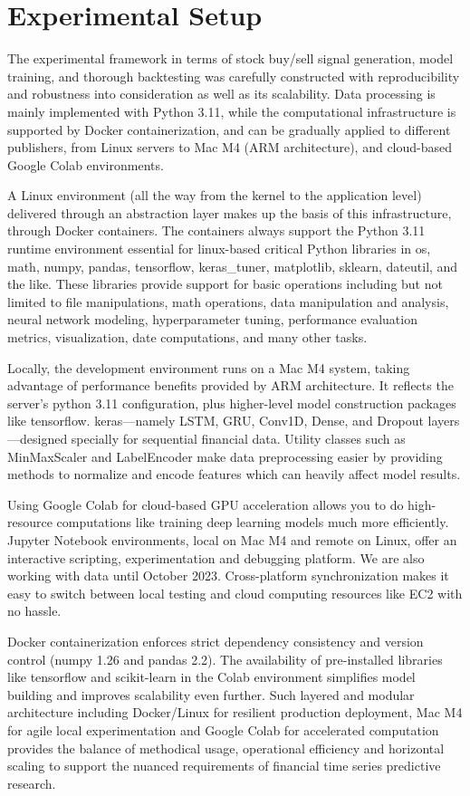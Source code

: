 \chapter{Experimental Setup}
The experimental framework in terms of stock buy/sell signal generation, model training, and thorough backtesting was carefully constructed with reproducibility and robustness into consideration as well as its scalability. Data processing is mainly implemented with Python 3.11, while the computational infrastructure is supported by Docker containerization, and can be gradually applied to different publishers, from Linux servers to Mac M4 (ARM architecture), and cloud-based Google Colab environments.

A Linux environment (all the way from the kernel to the application level) delivered through an abstraction layer makes up the basis of this infrastructure, through Docker containers. The containers always support the Python 3.11 runtime environment essential for linux-based critical Python libraries in os, math, numpy, pandas, tensorflow, keras\_tuner, matplotlib, sklearn, dateutil, and the like. These libraries provide support for basic operations including but not limited to file manipulations, math operations, data manipulation and analysis, neural network modeling, hyperparameter tuning, performance evaluation metrics, visualization, date computations, and many other tasks.

Locally, the development environment runs on a Mac M4 system, taking advantage of performance benefits provided by ARM architecture. It reflects the server’s python 3.11 configuration, plus higher-level model construction packages like tensorflow. keras—namely LSTM, GRU, Conv1D, Dense, and Dropout layers—designed specially for sequential financial data. Utility classes such as MinMaxScaler and LabelEncoder make data preprocessing easier by providing methods to normalize and encode features which can heavily affect model results.

Using Google Colab for cloud-based GPU acceleration allows you to do high-resource computations like training deep learning models much more efficiently. Jupyter Notebook environments, local on Mac M4 and remote on Linux, offer an interactive scripting, experimentation and debugging platform. We are also working with data until October 2023. Cross-platform synchronization makes it easy to switch between local testing and cloud computing resources like EC2 with no hassle.

Docker containerization enforces strict dependency consistency and version control (numpy 1.26 and pandas 2.2). The availability of pre-installed libraries like tensorflow and scikit-learn in the Colab environment simplifies model building and improves scalability even further. Such layered and modular architecture including Docker/Linux for resilient production deployment, Mac M4 for agile local experimentation and Google Colab for accelerated computation provides the balance of methodical usage, operational efficiency and horizontal scaling to support the nuanced requirements of financial time series predictive research.